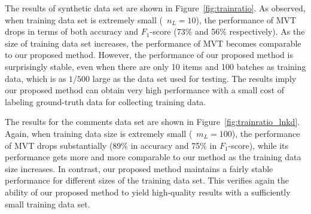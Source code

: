 The results of synthetic data set are shown in Figure~\ref{fig:trainratio}.  
As observed, when training data set is extremely small (\eg~$n_L=10$), 
the performance of MVT drops in terms of both accuracy and $F_1$-score (73\% and 56\% respectively).  
As the size of training data set increases, 
the performance of MVT becomes comparable to our proposed method.  
However, the performance of our proposed method is surprisingly stable, 
even when there are only 10 items and 100 batches as training data, 
which is as $1/500$ large as the data set used for testing.  
The results imply our proposed method can obtain very high performance 
with a small cost of labeling ground-truth data for collecting training data.  

The results for the comments data set are shown in Figure~\ref{fig:trainratio_lnkd}.  
Again, when training data size is extremely small (\eg~$m_L=100$), 
the performance of MVT drops substantially (89\% in accuracy and 75\% in $F_1$-score), 
while its performance gets more and more comparable to our method as the training data size increases.  
In contrast, our proposed method maintains a fairly stable 
performance for different sizes of the training data set. 
This verifies again the ability of our proposed method to yield high-quality results 
with a sufficiently small training data set.  


%
